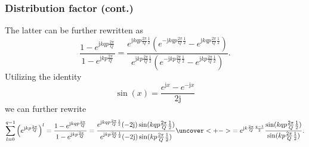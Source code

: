 \begin{frame}
	\frametitle{Distribution factor  (cont.)}
	\onslide<+->
	The latter can be further rewritten as
	$$
		\frac{1-e^{\mathrm{j} k q p\frac{2\pi}{Q}}}{1-e^{\mathrm{j} k p\frac{2\pi}{Q}}} = \frac{e^{\mathrm{j} k q p\frac{2\pi}{Q}\frac{1}{2}}\left(e^{-\mathrm{j} k q p\frac{2\pi}{Q}\frac{1}{2}}-e^{\mathrm{j} k q p\frac{2\pi}{Q}\frac{1}{2}}\right)}{e^{\mathrm{j} k p\frac{2\pi}{Q}\frac{1}{2}}\left(e^{-\mathrm{j} k p\frac{2\pi}{Q}\frac{1}{2}}-e^{\mathrm{j} k p\frac{2\pi}{Q}\frac{1}{2}}\right)}.
	$$
	\onslide<+->
	Utilizing the identity
	$$
		\sin(x) = \frac{e^{\mathrm{j} x}-e^{-\mathrm{j} x}}{2\mathrm{j}}
	$$
	\onslide<+->
	we can further rewrite
	\begin{equation}
		\sum_{l=0}^{q-1} \left(e^{\mathrm{j} k  p\frac{2\pi}{Q}}\right)^l =\frac{1-e^{\mathrm{j} k q p\frac{2\pi}{Q}}}{1-e^{\mathrm{j} k p\frac{2\pi}{Q}}} = \frac{e^{\mathrm{j} k q p\frac{2\pi}{Q}\frac{1}{2}}(-2\mathrm{j})\sin(k q p\frac{2\pi}{Q}\frac{1}{2})}{e^{\mathrm{j} k p\frac{2\pi}{Q}\frac{1}{2}}(-2\mathrm{j})\sin(k p\frac{2\pi}{Q}\frac{1}{2})}\uncover<+->{=e^{\mathrm{j}k\frac{2 \pi}{Q}\frac{q-1}{2}}\frac{\sin(k q p\frac{2\pi}{Q}\frac{1}{2})}{\sin(k p\frac{2\pi}{Q}\frac{1}{2})}.}
		\label{eq:sum_exp_distribution_factor_simplified}
	\end{equation}
\end{frame}


